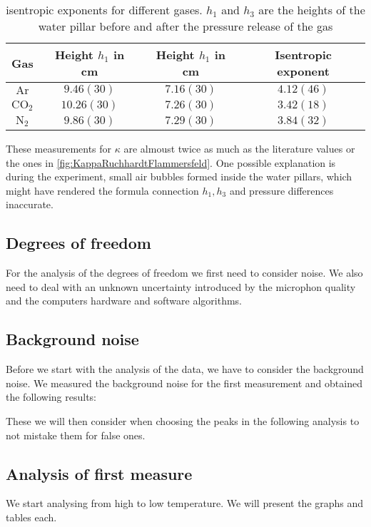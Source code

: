 \documentclass[../main.tex]{subfiles}
\begin{document}
            \begin{table}[H]
                \centering
                \begin{tabular}{c|cc|c}
                    \textbf{Gas} & \textbf{Height $h_1$ in cm} & \textbf{Height $h_1$ in cm} & \textbf{Isentropic exponent}\\
                    \hline
                    $\text{Ar}$ & $9.46(30)$ & $7.16(30)$ & $4.12(46)$\\
                    $\text{CO}_2$ & $10.26(30)$ & $7.26(30)$ & $3.42(18)$\\
                    $\text{N}_2$ & $9.86(30)$ & $7.29(30)$ & $3.84(32)$\\
                \end{tabular}
                \caption{isentropic exponents for different gases. $h_1$ and $h_3$ are the heights of the water pillar before and after the pressure release of the gas}
            \end{table}
            
            These measurements for $\kappa$ are almoust twice as much as the literature values or the ones in \ref{fig:KappaRuchhardtFlammersfeld}. One possible explanation is during the experiment, small air bubbles formed inside the water pillars, which might have rendered the formula connection $h_1,h_3$ and pressure differences inaccurate.

    \subsection{Degrees of freedom}
        For the analysis of the degrees of freedom we first need to consider noise. We also need to deal with an unknown uncertainty introduced by the microphon quality and the computers hardware and software algorithms. 
    \subsection*{Background noise}
        Before we start with the analysis of the data, we have to consider the background noise. We measured the background noise for the first measurement and obtained the following results:
        
        These we will then consider when choosing the peaks in the following analysis to not mistake them for false ones. 

    \subsection*{Analysis of first measure}
        We start analysing from high to low temperature. We will present the graphs and tables each. 
        
\end{document}
